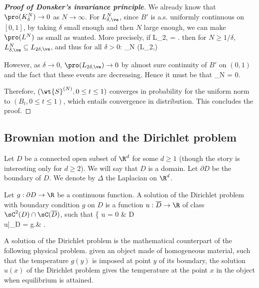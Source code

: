 \begin{proof}[\bf Proof of Donsker's invariance principle]
We already know that $\pro(K^N_\delta) \to 0$ as $N\to\infty$. For $L^N_{\delta,\ve}$, since $B'$ is a.s. uniformly continuous on $[0, 1]$, by taking $\delta$ small enough and then $N$ large enough, we can make $\pro(L^N)$ as small as wanted. More precisely, if
\be
L_{2\delta,\ve} = .
\ee
then for $N \geq 1/\delta$, $L^N_{\delta,\ve} \subseteq  L_{2\delta,\ve}$, and thus for all $\delta > 0$:
\be
\limsup_{N\to\infty} \pro{} \leq \pro(L_{2\delta,\ve})
\ee

However, as $\delta\to 0$, $\pro(L_{2\delta,\ve}) \to 0$ by almost sure continuity of $B'$ on $(0, 1)$ and the fact that these events are decreasing. Hence it must be that 
\be
\limsup_{N\to\infty} \pro{} = 0.
\ee

Therefore, $(\wt{S}^{(N)}, 0 \leq t \leq 1)$ converges in probability for the uniform norm to $(B_t, 0 \leq t \leq 1)$, which entails convergence in distribution. This concludes the proof.
\end{proof}


\subsection{Brownian motion and the Dirichlet problem}

Let $D$ be a connected open subset of $\R^d$ for some $d \geq 1$ (though the story is interesting only for $d \geq 2$). We will say that $D$ is a domain. Let $\partial D$ be the boundary of $D$. We denote by $\Delta$ the Laplacian on $\R^d$.

\begin{definition}\label{def:unique_bounded_solution_Dirichlet_problem}
Let $g : \partial D \to\R$ be a continuous function. A solution of the Dirichlet problem with boundary condition $g$ on $D$ is a function $u :\overline{D} \to\R$ of class $\sC^2(D) \cap \sC(\overline{D})$, such that
\be
\left\{
\Delta u = 0 & D\\
u|_{\partial D} = g.\quad\quad& 
\ea\right.
\ee
\end{definition}

A solution of the Dirichlet problem is the mathematical counterpart of the following physical problem. given an object made of homogeneous material, such that the temperature $g(y)$ is imposed at point $y$ of its boundary, the solution $u(x)$ of the Dirichlet problem gives the temperature at the point $x$ in the object when equilibrium is attained.


